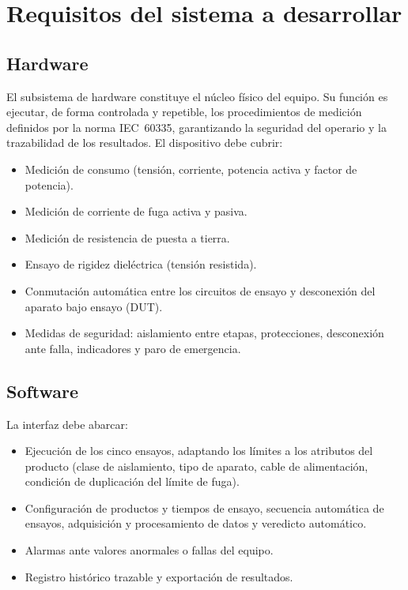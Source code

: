 \section{Requisitos del sistema a desarrollar}
\label{sec:requisitos}

\subsection{Hardware}
\label{subsec:requisitos_hw}

El subsistema de hardware constituye el núcleo físico del equipo. Su función es
ejecutar, de forma controlada y repetible, los procedimientos de medición
definidos por la norma IEC~60335, garantizando la seguridad del operario y la
trazabilidad de los resultados. El dispositivo debe cubrir:
\begin{itemize}
    \item Medición de consumo (tensión, corriente, potencia activa y factor de
          potencia).
    \item Medición de corriente de fuga activa y pasiva.
    \item Medición de resistencia de puesta a tierra.
    \item Ensayo de rigidez dieléctrica (tensión resistida).
    \item Conmutación automática entre los circuitos de ensayo y desconexión
          del aparato bajo ensayo (DUT).
    \item Medidas de seguridad: aislamiento entre etapas, protecciones,
          desconexión ante falla, indicadores y paro de emergencia.
\end{itemize}

\subsection{Software}
\label{subsec:requisitos_sw}

La interfaz debe abarcar:
\begin{itemize}
    \item Ejecución de los cinco ensayos, adaptando los límites a los atributos
          del producto (clase de aislamiento, tipo de aparato, cable de
          alimentación, condición de duplicación del límite de fuga).
    \item Configuración de productos y tiempos de ensayo, secuencia automática de
          ensayos, adquisición y procesamiento de datos y veredicto automático.
    \item Alarmas ante valores anormales o fallas del equipo.
    \item Registro histórico trazable y exportación de resultados.
\end{itemize}
